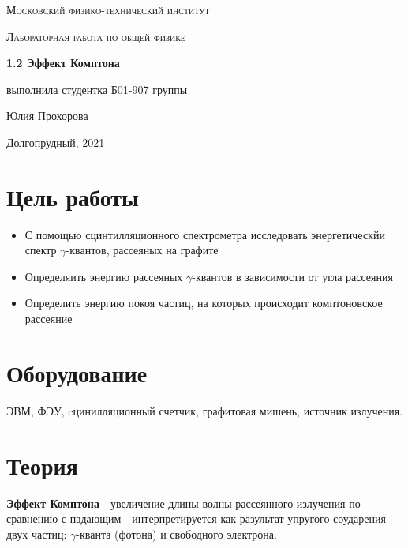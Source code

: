 \documentclass[a4paper]{article}
\begin{document}
\newcommand{\apple}{\char"F8FF}

\begin{titlepage}
	\centering
	\vspace{5cm}
    {\scshape\LARGE Московский физико-технический институт\par}


	\vspace{3cm}
	{\scshape\Large Лабораторная работа по общей физике \par}
	\vspace{1cm}
	{\huge\bfseries  1.2 Эффект Комптона \par}
	\vspace{1cm}
	\vfill
\begin{flushright}
	{\large выполнила студентка Б01-907 группы}\par
	\vspace{0.3cm}
	{\LARGE Юлия Прохорова }
\end{flushright}
	
	\vfill
Долгопрудный, 2021
\end{titlepage}

\tableofcontents

\newpage

\section{Цель работы}
\begin{itemize}
    \item С помощью сцинтилляционного спектрометра исследовать энергетическйи спектр
    $\gamma$-квантов, рассеяных на графите
    \item Определяить энергию рассеяных $\gamma$-квантов в зависимости от угла рассеяния
    \item Определить энергию покоя частиц, на которых происходит комптоновское рассеяние
\end{itemize}

\section{Оборудование}
ЭВМ, ФЭУ, cцинилляционный счетчик, графитовая мишень, источник излучения.

\section{Теория}

\textbf{Эффект Комптона} - увеличение длины волны рассеянного излучения по сравнению с падающим - 
интерпретируется как разультат упругого соударения двух частиц: $\gamma$-кванта (фотона) и свободного 
электрона.
\end{document}
